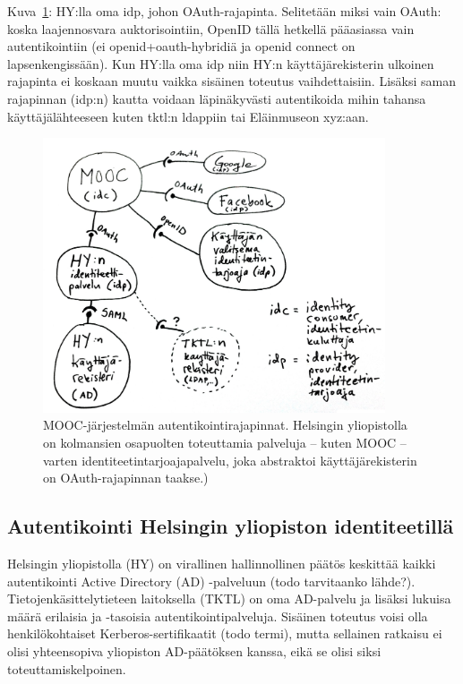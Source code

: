\documentclass[finnish,gradu]{tktltiki}
\begin{document}
Kuva~\ref{fig:mooc_hy_idp}: HY:lla oma idp, johon OAuth-rajapinta. Selitetään miksi vain OAuth: koska laajennosvara auktorisointiin, OpenID tällä hetkellä pääasiassa vain autentikointiin (ei openid+oauth-hybridiä ja openid connect on lapsenkengissään). Kun HY:lla oma idp niin HY:n käyttäjärekisterin ulkoinen rajapinta ei koskaan muutu vaikka sisäinen toteutus vaihdettaisiin. Lisäksi saman rajapinnan (idp:n) kautta voidaan läpinäkyvästi autentikoida mihin tahansa käyttäjälähteeseen kuten tktl:n ldappiin tai Eläinmuseon xyz:aan.

  \begin{figure}
    \centering
    \includegraphics[width=0.9\textwidth]{images/mooc_hy_idp.jpg}
    \caption{MOOC-järjestelmän autentikointirajapinnat. Helsingin yliopistolla on kolmansien osapuolten toteuttamia palveluja -- kuten MOOC -- varten identiteetintarjoajapalvelu, joka abstraktoi käyttäjärekisterin on OAuth-rajapinnan taakse.)}
    \label{fig:mooc_hy_idp}
  \end{figure}


  \subsection{Autentikointi Helsingin yliopiston identiteetillä} %
  \label{sub:autentikointi_helsingin_yliopiston_verkkoympäristössä}

  Helsingin yliopistolla (HY) on virallinen hallinnollinen päätös keskittää kaikki autentikointi Active Directory (AD) -palveluun (todo tarvitaanko lähde?).
  Tietojenkäsittelytieteen laitoksella (TKTL) on oma AD-palvelu ja lisäksi lukuisa määrä erilaisia ja -tasoisia autentikointipalveluja.
  Sisäinen toteutus voisi olla henkilökohtaiset Kerberos-sertifikaatit (todo termi), mutta sellainen ratkaisu ei olisi yhteensopiva yliopiston AD-päätöksen kanssa, eikä se olisi siksi toteuttamiskelpoinen.
\end{document}
